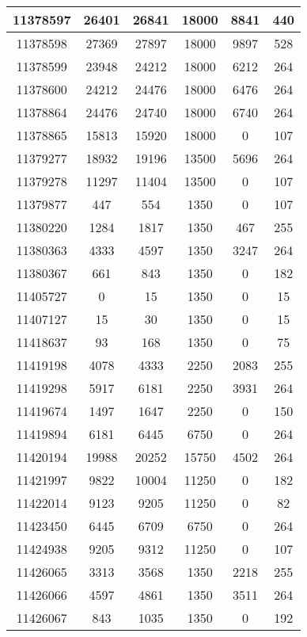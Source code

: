 \begin{appendices}
\begin{center}
\begin{longtable}{|c|c|c|c|c|c|}
11378597 & 26401 & 26841 & 18000 & 8841  & 440 \\ \hline
11378598 & 27369 & 27897 & 18000 & 9897  & 528 \\ \hline
11378599 & 23948 & 24212 & 18000 & 6212  & 264 \\ \hline
11378600 & 24212 & 24476 & 18000 & 6476  & 264 \\ \hline
11378864 & 24476 & 24740 & 18000 & 6740  & 264 \\ \hline
11378865 & 15813 & 15920 & 18000 & 0     & 107 \\ \hline
11379277 & 18932 & 19196 & 13500 & 5696  & 264 \\ \hline
11379278 & 11297 & 11404 & 13500 & 0     & 107 \\ \hline
11379877 & 447   & 554   & 1350  & 0     & 107 \\ \hline
11380220 & 1284  & 1817  & 1350  & 467   & 255 \\ \hline
11380363 & 4333  & 4597  & 1350  & 3247  & 264 \\ \hline
11380367 & 661   & 843   & 1350  & 0     & 182 \\ \hline
11405727 & 0     & 15    & 1350  & 0     & 15  \\ \hline
11407127 & 15    & 30    & 1350  & 0     & 15  \\ \hline
11418637 & 93    & 168   & 1350  & 0     & 75  \\ \hline
11419198 & 4078  & 4333  & 2250  & 2083  & 255 \\ \hline
11419298 & 5917  & 6181  & 2250  & 3931  & 264 \\ \hline
11419674 & 1497  & 1647  & 2250  & 0     & 150 \\ \hline
11419894 & 6181  & 6445  & 6750  & 0     & 264 \\ \hline
11420194 & 19988 & 20252 & 15750 & 4502  & 264 \\ \hline
11421997 & 9822  & 10004 & 11250 & 0     & 182 \\ \hline
11422014 & 9123  & 9205  & 11250 & 0     & 82  \\ \hline
11423450 & 6445  & 6709  & 6750  & 0     & 264 \\ \hline
11424938 & 9205  & 9312  & 11250 & 0     & 107 \\ \hline
11426065 & 3313  & 3568  & 1350  & 2218  & 255 \\ \hline
11426066 & 4597  & 4861  & 1350  & 3511  & 264 \\ \hline
11426067 & 843   & 1035  & 1350  & 0     & 192 \\ \hline

\end{longtable}
\end{center}
\end{appendices}
